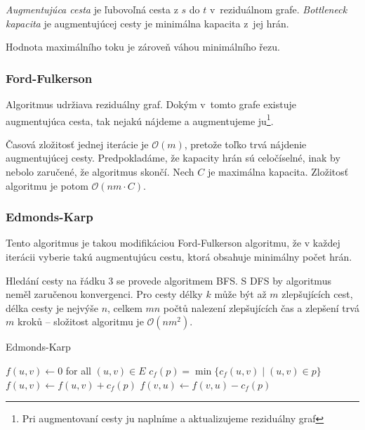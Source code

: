 {\em Augmentujúca cesta} je ľubovoľná cesta z $s$ do $t$
v~reziduálnom grafe. {\em Bottleneck kapacita} je augmentujúcej
cesty je minimálna kapacita z~jej hrán.

\begin{theorem}
Hodnota maximálního toku je zároveň váhou minimálního řezu.
\end{theorem}

\subsubsection{Ford-Fulkerson}
Algoritmus udržiava reziduálny graf. Dokým v~tomto grafe
existuje augmentujúca cesta, tak nejakú nájdeme a 
augmentujeme ju\footnote{Pri augmentovaní cesty ju naplníme 
a aktualizujeme reziduálny graf}.

Časová zložitosť jednej iterácie je $\mathcal{O}(m)$, pretože
toľko trvá nájdenie augmentujúcej cesty. Predpokladáme, že 
kapacity hrán sú celočíselné, inak by nebolo zaručené, že algoritmus skončí. 
Nech $C$ je maximálna kapacita. Zložitosť algoritmu je potom $\mathcal{O}(nm \cdot C)$.

\subsubsection{Edmonds-Karp}

Tento algoritmus je takou modifikáciou Ford-Fulkerson algoritmu,
že v každej iterácii vyberie takú augmentujúcu cestu, ktorá obsahuje
minimálny počet hrán.

Hledání cesty na řádku 3 se provede algoritmem BFS. S DFS by algoritmus
neměl zaručenou konvergenci. Pro cesty délky $k$
může být až $m$ zlepšujících cest, délka cesty je nejvýše
$n$, celkem $mn$
počtů nalezení zlepšujících čas a zlepšení trvá $m$
kroků -- složitost algoritmu je
$\mathcal{O}(nm^2)$.

\begin{algorithm}[H]
\caption{Edmonds-Karp}
\begin{algorithmic}[1]
    \State $f(u,v) \gets 0$ for all $(u,v) \in E$
        \State $c_f(p) = \min \{ c_f(u,v) \mid (u,v) \in p \}$
            \State $f(u,v) \gets f(u,v) + c_f(p)$
            \State $f(v,u) \gets f(v,u) - c_f(p)$
        \EndFor
    \EndWhile
\EndFunction
\end{algorithmic}
\end{algorithm}

